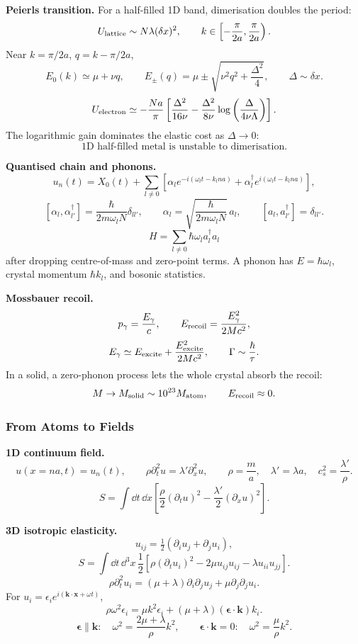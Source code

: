 \noindent\textbf{Peierls transition.}
For a half-filled 1D band, dimerisation doubles the period:
\[
U_{\rm lattice}\sim N\lambda(\delta x)^2,\qquad
k\in\left[-\frac{\pi}{2a},\frac{\pi}{2a}\right).
\]
Near $k=\pi/2a$, $q=k-\pi/2a$,
\[
E_0(k)\simeq\mu+\nu q,\qquad
E_\pm(q)=\mu\pm\sqrt{\nu^2q^2+\frac{\Delta^2}{4}},\qquad
\Delta\sim\delta x.
\]
\[
U_{\rm electron}\simeq
-\frac{Na}{\pi}\left[
\frac{\Delta^2}{16\nu}
-\frac{\Delta^2}{8\nu}\log\left(\frac{\Delta}{4\nu\Lambda}\right)
\right].
\]
The logarithmic gain dominates the elastic cost as $\Delta\to0$:
\[
\boxed{\text{1D half-filled metal is unstable to dimerisation.}}
\]

\noindent\textbf{Quantised chain and phonons.}
\[
u_n(t)=X_0(t)+\sum_{l\ne0}\left[
\alpha_l e^{-i(\omega_lt-k_lna)}
+\alpha_l^\dagger e^{i(\omega_lt-k_lna)}\right],
\]
\[
[\alpha_l,\alpha_{l'}^\dagger]=\frac{\hbar}{2m\omega_lN}\delta_{ll'},\qquad
\alpha_l=\sqrt{\frac{\hbar}{2m\omega_lN}}\,a_l,\qquad
[a_l,a_{l'}^\dagger]=\delta_{ll'}.
\]
\[
\boxed{H=\sum_{l\ne0}\hbar\omega_la_l^\dagger a_l}
\]
after dropping centre-of-mass and zero-point terms. A phonon has
$E=\hbar\omega_l$, crystal momentum $\hbar k_l$, and bosonic statistics.

\noindent\textbf{Mossbauer recoil.}
\[
p_\gamma=\frac{E_\gamma}{c},\qquad
E_{\rm recoil}=\frac{E_\gamma^2}{2Mc^2},
\]
\[
E_\gamma\simeq E_{\rm excite}+\frac{E_{\rm excite}^2}{2Mc^2},\qquad
\Gamma\sim\frac{\hbar}{\tau}.
\]
In a solid, a zero-phonon process lets the whole crystal absorb the recoil:
\[
M\to M_{\rm solid}\sim10^{23}M_{\rm atom},\qquad E_{\rm recoil}\approx0.
\]

\subsubsection*{From Atoms to Fields}

\noindent\textbf{1D continuum field.}
\[
u(x=na,t)=u_n(t),\qquad
\rho\partial_t^2u=\lambda'\partial_x^2u,\qquad
\rho=\frac ma,\quad \lambda'=\lambda a,\quad c_s^2=\frac{\lambda'}{\rho}.
\]
\[
S=\int\dd t\,\dd x\left[
\frac{\rho}{2}(\partial_tu)^2-\frac{\lambda'}{2}(\partial_xu)^2\right].
\]

\noindent\textbf{3D isotropic elasticity.}
\[
u_{ij}=\tfrac12(\partial_iu_j+\partial_ju_i),
\]
\[
S=\int\dd t\,\dd^3x\,\frac12\left[
\rho(\partial_tu_i)^2-2\mu u_{ij}u_{ij}-\lambda u_{ii}u_{jj}\right].
\]
\[
\rho\partial_t^2u_i=(\mu+\lambda)\partial_i\partial_ju_j+\mu\partial_j\partial_ju_i.
\]
For $u_i=\epsilon_i e^{i(\mathbf k\cdot\mathbf x+\omega t)}$,
\[
\rho\omega^2\epsilon_i=\mu k^2\epsilon_i+(\mu+\lambda)(\bm\epsilon\cdot\mathbf k)k_i.
\]
\[
\bm\epsilon\parallel\mathbf k:\quad \omega^2=\frac{2\mu+\lambda}{\rho}k^2,
\qquad
\bm\epsilon\cdot\mathbf k=0:\quad \omega^2=\frac{\mu}{\rho}k^2.
\]

